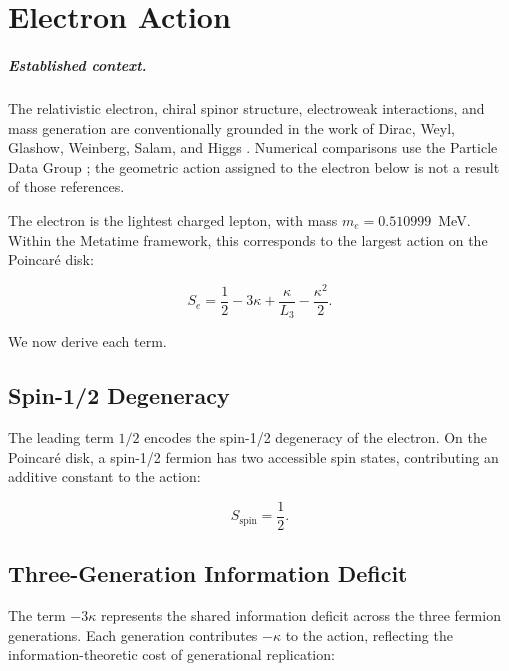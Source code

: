 \chapter{Electron Action}
\label{ch:electron_action}


\paragraph{Established context.}
The relativistic electron, chiral spinor structure, electroweak interactions, and
mass generation are conventionally grounded in the work of Dirac, Weyl,
Glashow, Weinberg, Salam, and Higgs
\cite{Dirac1928,Weyl1929,Glashow1961,Weinberg1967,Salam1968,Higgs1964}.
Numerical comparisons use the Particle Data Group \cite{PDG2024}; the geometric
action assigned to the electron below is not a result of those references.

The electron is the lightest charged lepton, with mass \(m_e =
0.510999\)~MeV.  Within the Metatime framework, this corresponds to the
largest action on the Poincar\'{e} disk:

\begin{equation}
S_e = \frac12 - 3\kappa + \frac{\kappa}{L_3} - \frac{\kappa^2}{2}.
\label{eq:Se_full}
\end{equation}

We now derive each term.

\section{Spin-1/2 Degeneracy}

The leading term \(1/2\) encodes the spin-1/2 degeneracy of the electron.
On the Poincar\'{e} disk, a spin-1/2 fermion has two accessible spin states,
contributing an additive constant to the action:

\begin{equation}
S_{\text{spin}} = \frac12.
\label{eq:spin_term}
\end{equation}

\section{Three-Generation Information Deficit}

The term \(-3\kappa\) represents the shared information deficit across the
three fermion generations.  Each generation contributes \(-\kappa\) to the
action, reflecting the information-theoretic cost of generational replication:

